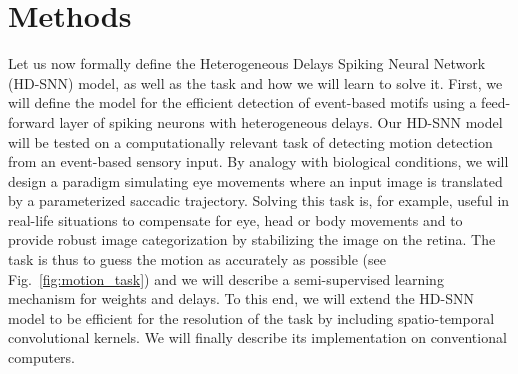 \documentclass[default]{sn-jnl}%
\theoremstyle{thmstyleone}%
\theoremstyle{thmstyletwo}%
\theoremstyle{thmstylethree}%
\newcommand{\seeFig}[1]{see Fig.~\ref{fig:#1}}%
\begin{document}
\section{Methods}
\label{sec:methods}
Let us now formally define the Heterogeneous Delays Spiking Neural Network (HD-SNN) model, as well as the task and how we will learn to solve it. First, we will define the model for the efficient detection of event-based motifs using a feed-forward layer of spiking neurons with heterogeneous delays. Our HD-SNN model will be tested on a computationally relevant task of detecting motion detection from an event-based sensory input. By analogy with biological conditions, we will design a paradigm simulating eye movements where an input image is translated by a parameterized saccadic trajectory. Solving this task is, for example, useful in real-life situations to compensate for eye, head or body movements and to provide robust image categorization by stabilizing the image on the retina. The task is thus to guess the motion as accurately as possible (\seeFig{motion_task}) and we will describe a semi-supervised learning mechanism for weights and delays. To this end, we will extend the HD-SNN model to be efficient for the resolution of the task by including spatio-temporal convolutional kernels. We will finally describe its implementation on conventional computers. 
%
\end{document}
